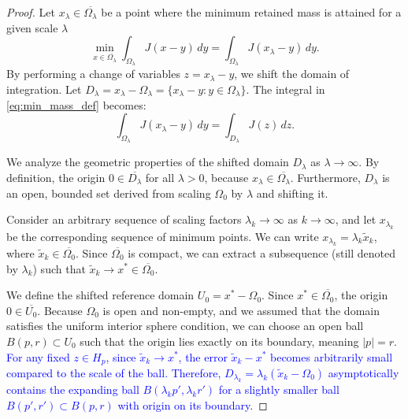 \documentclass[12pt, a4paper]{article}
\newcommand{\revision}[1]{\textcolor{blue}{#1}}
\theoremstyle{break}
\theoremstyle{break}
\theoremstyle{break}
\theoremstyle{break}
\theoremstyle{break}
\theoremstyle{break}
\theoremstyle{break}
\theoremstyle{break}
\theoremstyle{break}
\begin{document}
\begin{proof}
Let $x_\lambda \in \overline{\Omega_\lambda}$ be a point where the minimum retained mass is attained for a given scale $\lambda$
\begin{equation} \label{eq:min_mass_def}
    \min_{x \in \overline{\Omega_\lambda}} \int_{\Omega_\lambda} J(x-y) \, dy = \int_{\Omega_\lambda} J(x_\lambda - y) \, dy.
\end{equation}
By performing a change of variables $z = x_\lambda - y$, we shift the domain of integration. Let $D_\lambda = x_\lambda - \Omega_\lambda = \{ x_\lambda - y : y \in \Omega_\lambda \}$. The integral in \eqref{eq:min_mass_def} becomes:
\begin{equation}
    \int_{\Omega_\lambda} J(x_\lambda - y) \, dy = \int_{D_\lambda} J(z) \, dz.
\end{equation}

We analyze the geometric properties of the shifted domain $D_\lambda$ as $\lambda \to \infty$. By definition, the origin $0 \in \overline{D_\lambda}$ for all $\lambda > 0$, because $x_\lambda \in \overline{\Omega_\lambda}$. Furthermore, $D_\lambda$ is an open, bounded set derived from scaling $\Omega_0$ by $\lambda$ and shifting it. 

Consider an arbitrary sequence of scaling factors $\lambda_k \to \infty$ as $k \to \infty$, and let $x_{\lambda_k}$ be the corresponding sequence of minimum points. We can write $x_{\lambda_k} = \lambda_k \tilde{x}_k$, where $\tilde{x}_k \in \overline{\Omega_0}$. Since $\overline{\Omega_0}$ is compact, we can extract a subsequence (still denoted by $\lambda_k$) such that $\tilde{x}_k \to x^* \in \overline{\Omega_0}$.

We define the shifted reference domain $U_0 = x^* - \Omega_0$. Since $x^* \in \overline{\Omega_0}$, the origin $0 \in \overline{U_0}$. Because $\Omega_0$ is open and non-empty, and we assumed that the domain satisfies the uniform interior sphere condition, we can choose an open ball $B(p, r) \subset U_0$ such that the origin lies exactly on its boundary, meaning $|p| = r$. \revision{For any fixed $z \in H_p$, since $\tilde{x}_k \to x^*$, the error $\tilde{x}_k - x^*$ becomes arbitrarily small compared to the scale of the ball. Therefore, $D_{\lambda_k} = \lambda_k (\tilde{x}_k - \Omega_0)$ asymptotically contains the expanding ball $B(\lambda_k p', \lambda_k r')$ for a slightly smaller ball $B(p', r') \subset B(p, r)$ with origin on its boundary.}


\end{proof}
\end{document}
